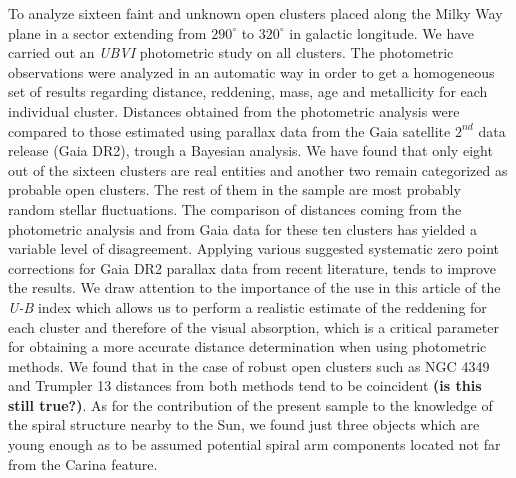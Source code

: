 \documentclass[draft]{aa}
\begin{document}
\abstract
{}
{To analyze sixteen faint and unknown open clusters placed along the Milky Way
plane in a sector extending from $290^\circ$ to $320^\circ$ in galactic
longitude.}
{We have carried out an \textit{UBVI} photometric study on all clusters. The
photometric observations were analyzed in an automatic way in order to get a
homogeneous set of results regarding distance, reddening, mass, age and
metallicity for each individual cluster. Distances obtained from the
photometric analysis were compared to those estimated using parallax data from
the Gaia satellite $2^{nd}$ data release (Gaia DR2), trough a Bayesian
analysis.}
{We have found that only eight out of the sixteen clusters are real entities
and another two remain categorized as probable open clusters. The rest of them
in the sample are most probably random stellar fluctuations. The comparison of
distances coming from the photometric analysis and from Gaia data for these ten
clusters has yielded a variable level of disagreement.
%
Applying various suggested systematic zero point corrections for Gaia
DR2 parallax data from recent literature, tends to improve the results.
%
We draw attention to the importance of the use in this article of the 
\textit{U-B} index which allows us to perform a realistic estimate of the
reddening for each cluster and therefore of the visual absorption, which is a
critical parameter for obtaining a more accurate distance determination when
using photometric methods.}
%
{We found that in the case of robust open clusters such as NGC 4349
and Trumpler 13 distances from both methods tend to be coincident
\textbf{(is this still true?)}.
As for the contribution of the present sample to the knowledge of the spiral
structure nearby to the Sun, we found just three objects which are young enough
as to be assumed potential spiral arm components located not far from the
Carina feature.}

\end{document}
